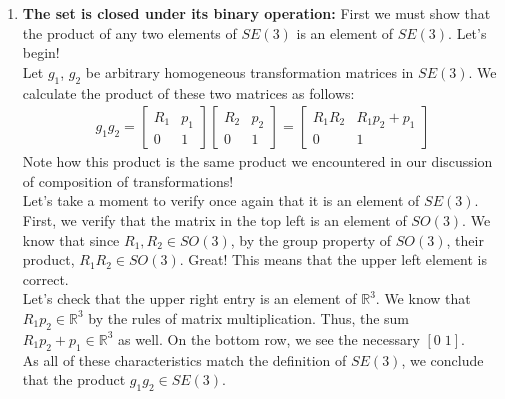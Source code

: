 \documentclass[oneside]{book}
\begin{document}
\begin{enumerate}
    \item \textbf{The set is closed under its binary operation:} First we must show that the product of any two elements of $SE(3)$ is an element of $SE(3)$. Let's begin!\\
    Let $g_1$, $g_2$ be arbitrary homogeneous transformation matrices in $SE(3)$. We calculate the product of these two matrices as follows:
    \begin{align}
        g_1g_2 = 
        \begin{bmatrix}
        R_1 & p_1\\
        0 & 1
        \end{bmatrix}
        \begin{bmatrix}
        R_2 & p_2\\
        0 & 1
        \end{bmatrix}
        = 
        \begin{bmatrix}
        R_1R_2 & R_1p_2 + p_1\\
        0 & 1
    \end{bmatrix}
    \end{align}
    Note how this product is the same product we encountered in our discussion of composition of transformations!\\
    Let's take a moment to verify once again that it is an element of $SE(3)$.\\
    First, we verify that the matrix in the top left is an element of $SO(3)$. We know that since $R_1, R_2 \in SO(3)$, by the group property of $SO(3)$, their product, $R_1R_2 \in SO(3)$. Great! This means that the upper left element is correct.\\
    Let's check that the upper right entry is an element of $\mathbb{R}^3$. We know that $R_1p_2 \in \mathbb{R}^3$ by the rules of matrix multiplication. Thus, the sum $R_1p_2 + p_1 \in \mathbb{R}^3$ as well. On the bottom row, we see the necessary $[0\; 1]$.\\
    As all of these characteristics match the definition of $SE(3)$, we conclude that the product $g_1g_2 \in SE(3)$.
    

\end{enumerate}
\end{document}
